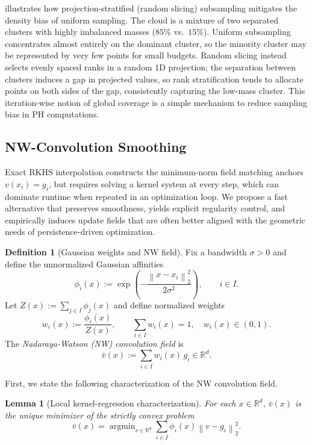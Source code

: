 \documentclass{article} %
\newcommand{\R}{\mathbb{R}}
\newcommand*{\norm}[1]{\left\|#1\right\|}
\theoremstyle{plain}
\newtheorem{lemma}[theorem]{Lemma}
\theoremstyle{definition}
\newtheorem{definition}[theorem]{Definition}
\theoremstyle{remark}
\begin{document}
 illustrates how projection-stratified (random slicing) subsampling mitigates the density bias
of uniform sampling.
The cloud is a mixture of two separated clusters with highly imbalanced masses ($85\%$ vs.\ $15\%$).
Uniform subsampling concentrates almost entirely on the dominant cluster, so the minority cluster may be represented by
very few points for small budgets.
Random slicing instead selects evenly spaced ranks in a random 1D projection; the separation between clusters induces a
gap in projected values, so rank stratification tends to allocate points on both sides of the gap, consistently capturing
the low-mass cluster.
This iteration-wise notion of global coverage is a simple mechanism to reduce sampling bias in PH computations.








\subsection{NW-Convolution Smoothing}
\label{subsec:nw}


Exact RKHS interpolation constructs the minimum-norm field matching anchors $v(x_i) = g_i$, but requires solving a kernel system at every step, which can dominate runtime when repeated in an optimization loop. We propose a fast alternative that preserves smoothness, yields explicit regularity control, and empirically induces update fields that are often better aligned with
the geometric needs of persistence-driven optimization.

\begin{definition}[Gaussian weights and NW field] \label{def:nw_field}
Fix a bandwidth $\sigma>0$ and define the unnormalized Gaussian affinities
    \[ \phi_i(x) := \exp \left(-\frac{\norm{x - x_i}_2^2}{2\sigma^2} \right), \qquad i \in I. \]
Let $Z(x):=\sum_{j\in I}\phi_j(x)$ and define normalized weights
\begin{equation}
\label{eq:nw_weights}
w_i(x) := \frac{\phi_i(x)}{Z(x)}, \qquad \sum_{i\in I} w_i(x)=1,\quad w_i(x)\in(0,1).
\end{equation}
The \emph{Nadaraya-Watson (NW) convolution field} is
\begin{equation}
\label{eq:nw_def}
\bar v(x) := \sum_{i\in I} w_i(x)\, g_i \in \R^d.
\end{equation}
\end{definition}

First, we state the following characterization of the NW convolution field.
\begin{lemma}[Local kernel-regression characterization]
\label{lem:nw_variational}
For each $x \in \R^d$, $\bar v(x)$ is the unique minimizer of the strictly convex problem
\begin{equation}
\label{eq:local_wls}
    \bar v(x) = \mathop{\arg\min}_{v \in \R^d} \sum_{i \in I} \phi_i(x) \norm{ v - g_i}_2^2.
\end{equation}
\end{lemma}
\end{document}
